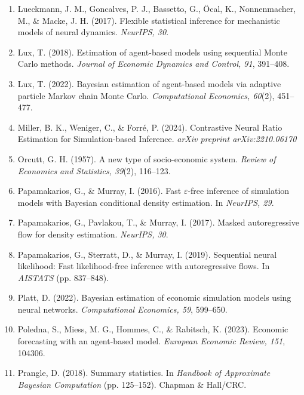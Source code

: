 \documentclass[12pt]{article}
\begin{document}
\begin{enumerate}
\item Lueckmann, J. M., Goncalves, P. J., Bassetto, G., Öcal, K., Nonnenmacher, M., \& Macke, J. H. (2017). Flexible statistical inference for mechanistic models of neural dynamics. \textit{NeurIPS, 30}.

\item Lux, T. (2018). Estimation of agent-based models using sequential Monte Carlo methods. \textit{Journal of Economic Dynamics and Control, 91}, 391--408.

\item Lux, T. (2022). Bayesian estimation of agent-based models via adaptive particle Markov chain Monte Carlo. \textit{Computational Economics, 60}(2), 451--477.

\item Miller, B. K., Weniger, C., \& Forré, P. (2024). Contrastive Neural Ratio Estimation for Simulation-based Inference. \textit{arXiv preprint arXiv:2210.06170}

\item Orcutt, G. H. (1957). A new type of socio-economic system. \textit{Review of Economics and Statistics, 39}(2), 116--123.

\item Papamakarios, G., \& Murray, I. (2016). Fast $\varepsilon$-free inference of simulation models with Bayesian conditional density estimation. In \textit{NeurIPS, 29}.

\item Papamakarios, G., Pavlakou, T., \& Murray, I. (2017). Masked autoregressive flow for density estimation. \textit{NeurIPS, 30}.

\item Papamakarios, G., Sterratt, D., \& Murray, I. (2019). Sequential neural likelihood: Fast likelihood-free inference with autoregressive flows. In \textit{AISTATS} (pp. 837--848).

\item Platt, D. (2022). Bayesian estimation of economic simulation models using neural networks. \textit{Computational Economics, 59}, 599--650.

\item Poledna, S., Miess, M. G., Hommes, C., \& Rabitsch, K. (2023). Economic forecasting with an agent-based model. \textit{European Economic Review, 151}, 104306.

\item Prangle, D. (2018). Summary statistics. In \textit{Handbook of Approximate Bayesian Computation} (pp. 125--152). Chapman \& Hall/CRC.


\end{enumerate}
\end{document}
